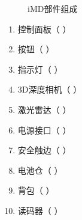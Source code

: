 \documentclass[a4paper,11pt,english,openany,oneside]{sphinxmanual}
\begin{document}
\begin{figure}[H]
\centering
\capstart

\noindent{}
\caption{iM\sphinxhyphen{}D部件组成}\label{\detokenize{06 _u7cfb_u7edf_u6982_u8ff0:id5}}\end{figure}
\begin{enumerate}
%
\item {} 
\sphinxAtStartPar
控制面板（ {\hyperref[\detokenize{07 _u6280_u672f_u89c4_u683c:id38}]{}} ）

\item {} 
\sphinxAtStartPar
按钮（ {\hyperref[\detokenize{07 _u6280_u672f_u89c4_u683c:id20}]{}} ）

\item {} 
\sphinxAtStartPar
指示灯（ {\hyperref[\detokenize{07 _u6280_u672f_u89c4_u683c:id16}]{}} ）

\item {} 
\sphinxAtStartPar
3D深度相机（ {\hyperref[\detokenize{_u9009_u914d_u8bbe_u5907:d}]{}} ）

\item {} 
\sphinxAtStartPar
激光雷达（ {\hyperref[\detokenize{07 _u6280_u672f_u89c4_u683c:id30}]{}} ）

\item {} 
\sphinxAtStartPar
电源接口（ {\hyperref[\detokenize{08 _u5b89_u88c5_u4e0e_u8c03_u8bd5:id11}]{}} ）

\item {} 
\sphinxAtStartPar
安全触边（ {\hyperref[\detokenize{07 _u6280_u672f_u89c4_u683c:id32}]{}} ）

\item {} 
\sphinxAtStartPar
电池仓（ {\hyperref[\detokenize{08 _u5b89_u88c5_u4e0e_u8c03_u8bd5:id23}]{}} ）

\item {} 
\sphinxAtStartPar
背包（ {\hyperref[\detokenize{_u9009_u914d_u8bbe_u5907:id28}]{}} ）

\item {} 
\sphinxAtStartPar
读码器（ {\hyperref[\detokenize{07 _u6280_u672f_u89c4_u683c:id34}]{}} ）

\end{enumerate}
\end{document}

